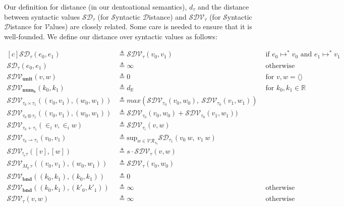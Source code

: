 Our definition for distance (in our dentoational semantics), $d_\tau$ and the
distance between syntactic values $\mathcal{SD}_\tau$ (for $\mathcal{S}$yntactic
$\mathcal{D}$istance) and $\mathcal{SDV}_\tau$ (for $\mathcal{S}$yntactic
$\mathcal{D}$istance for $\mathcal{V}$alues) are closely related. Some care is
needed to ensure that it is well-founded. We define our distance over syntactic
values as follows:

\begin{definition}
  \begin{equation}
  \begin{aligned}[c]
    \mathcal{SD_{\tau}}(e_0, e_1) &\triangleq \mathcal{SDV}_{\tau}(v_0, v_1)
    &\text{ if } e_0 \mapsto^{*} v_0 \text{ and } e_1 \mapsto^{*} v_1 \\
    \mathcal{SD_{\tau}}(e_0, e_1) &\triangleq \infty &\text{ otherwise } \\
    \mathcal{SDV_{\mathbf{unit}}}(v, w) &\triangleq 0 &\text{ for } v, w =
      \langle \rangle \\
    \mathcal{SDV}_{\mathbf{num_{b}}}(k_0, k_1) &\triangleq 
      d_\mathbb{R} &\text{ for } k_0, k_1 \in \mathbb{R} \\
    \mathcal{SDV}_{\tau_0 \times \tau_1}((v_0, v_1), (w_0, w_1)) 
      &\triangleq max(\mathcal{SDV}_{\tau_0}(v_0, w_0),~\mathcal{SDV}_{\tau_0}(v_1, w_1))
    \\
    \mathcal{SDV}_{\tau_0 \otimes \tau_1}((v_0, v_1), (w_0, w_1)) 
      &\triangleq \mathcal{SDV}_{\tau_0}(v_0, w_0) + \mathcal{SDV}_{\tau_0}(v_1, w_1))
    \\
    \mathcal{SDV}_{\tau_0 + \tau_1}(\in_i v, \in_i w) 
      &\triangleq \mathcal{SDV}_{\tau_i}(v, w)
    \\
    \mathcal{SDV}_{\tau_0 \multimap \tau_1}(v_0, v_1) 
      &\triangleq \text{sup}_{w \in \mathcal{VR}_{\tau_0}} \mathcal{SD}_{\tau_1}(v_0~w,~v_1~w)
    \\
    \mathcal{SDV}_{!_s \tau}([v], [w]) 
      &\triangleq s \cdot \mathcal{SDV}_{\tau}(v, w)
    \\
    \mathcal{SDV}_{M_q~\tau}((v_0, v_1), (w_0, w_1)) 
      &\triangleq \mathcal{SDV}_{\tau}(v_0, w_0)
    \\
    \mathcal{SDV}_{\textbf{bnd}}((k_0, k_1), (k_0, k_1)) 
      &\triangleq 0 
    \\
    \mathcal{SDV}_{\textbf{bnd}}((k_0, k_1), (k'_0, k'_1)) 
    &\triangleq \infty &\text{ otherwise }
    \\
    \mathcal{SDV_{\tau}}(v, w) &\triangleq \infty &\text{ otherwise } \\
  \end{aligned}
  \end{equation}
\end{definition}

